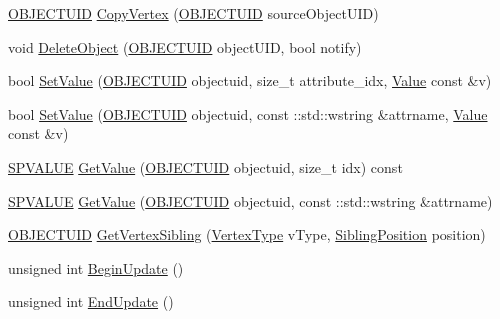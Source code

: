 \begin{DoxyCompactItemize}
\item 
\hyperlink{_object_database_defines_8h_a164ec120b01429b93c9cd0bef2a67e64}{O\+B\+J\+E\+C\+T\+U\+I\+D} \hyperlink{class_i_object_database_a92452c8a2b2926b30155df8ead23a6ee}{Copy\+Vertex} (\hyperlink{_object_database_defines_8h_a164ec120b01429b93c9cd0bef2a67e64}{O\+B\+J\+E\+C\+T\+U\+I\+D} source\+Object\+U\+I\+D)
\item 
void \hyperlink{class_i_object_database_a97a808e16aabd650edd2dc2f505cd81c}{Delete\+Object} (\hyperlink{_object_database_defines_8h_a164ec120b01429b93c9cd0bef2a67e64}{O\+B\+J\+E\+C\+T\+U\+I\+D} object\+U\+I\+D, bool notify)
\item 
bool \hyperlink{class_i_object_database_af8e450e2ed005ee2a8fea70ad687fdac}{Set\+Value} (\hyperlink{_object_database_defines_8h_a164ec120b01429b93c9cd0bef2a67e64}{O\+B\+J\+E\+C\+T\+U\+I\+D} objectuid, size\+\_\+t attribute\+\_\+idx, \hyperlink{class_value}{Value} const \&v)
\item 
bool \hyperlink{class_i_object_database_a10b651ad4aba30094c9dd93b1a3ed9a7}{Set\+Value} (\hyperlink{_object_database_defines_8h_a164ec120b01429b93c9cd0bef2a67e64}{O\+B\+J\+E\+C\+T\+U\+I\+D} objectuid, const \+::std\+::wstring \&attrname, \hyperlink{class_value}{Value} const \&v)
\item 
\hyperlink{_object_database_defines_8h_adb988003a1a002d7305cf476a0dbee1d}{S\+P\+V\+A\+L\+U\+E} \hyperlink{class_i_object_database_a6da96459b91546156530fbc2e08f1527}{Get\+Value} (\hyperlink{_object_database_defines_8h_a164ec120b01429b93c9cd0bef2a67e64}{O\+B\+J\+E\+C\+T\+U\+I\+D} objectuid, size\+\_\+t idx) const 
\item 
\hyperlink{_object_database_defines_8h_adb988003a1a002d7305cf476a0dbee1d}{S\+P\+V\+A\+L\+U\+E} \hyperlink{class_i_object_database_ae17f0f410fd5e941269cd5b4d827d4ba}{Get\+Value} (\hyperlink{_object_database_defines_8h_a164ec120b01429b93c9cd0bef2a67e64}{O\+B\+J\+E\+C\+T\+U\+I\+D} objectuid, const \+::std\+::wstring \&attrname)
\item 
\hyperlink{_object_database_defines_8h_a164ec120b01429b93c9cd0bef2a67e64}{O\+B\+J\+E\+C\+T\+U\+I\+D} \hyperlink{class_i_object_database_a3f7fd532ab8e1ea595b678570294cc9b}{Get\+Vertex\+Sibling} (\hyperlink{_object_database_defines_8h_afa099a55c5746eff5a0e1ffc04f53cc0}{Vertex\+Type} v\+Type, \hyperlink{_object_database_defines_8h_a9507b0b115184061c7002f25c82fc6d7}{Sibling\+Position} position)
\item 
unsigned int \hyperlink{class_i_object_database_a71e510607375ce6c0a23321f55960c7f}{Begin\+Update} ()
\item 
unsigned int \hyperlink{class_i_object_database_aaa379f7c8330c3aa5b334bf311f7d674}{End\+Update} ()
\end{DoxyCompactItemize}


